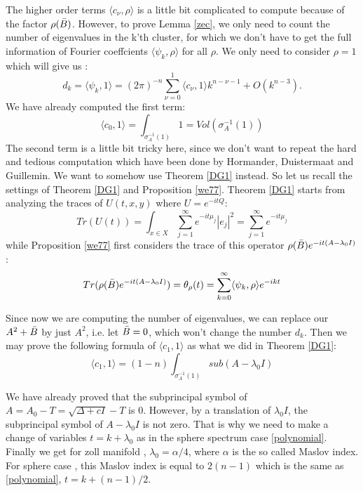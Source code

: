 \documentclass[10pt]{amsart}
\newcommand{\1}{\mathbb{1}}
\begin{document}
The higher order terms $\langle c_{\nu}, \rho \rangle$ is a little bit complicated to compute because of the factor $\rho(\Bar{B})$. However, to prove Lemma \ref{zec}, we only need to count the number of eigenvalues in the k'th cluster, for which we don't have to get the full information of Fourier coeffcients $\langle \psi_k, \rho \rangle$ for all $\rho$.  We only need to consider $\rho =1$ which will give us :
\begin{equation}
    d_k = \langle \psi_k ,1  \rangle = (2\pi)^{-n} \sum_{\nu = 0}^{1} \langle c_{\nu}, 1\rangle k^{n-\nu -1} + O(k^{n-3}).
\end{equation}
We have already computed the first term:
\[
\langle c_0,1  \rangle = \int_{\sigma_A^{-1}(1)} 1 = Vol(\sigma_A^{-1}(1))
\]
The second term is a little bit tricky here, since we don't want to repeat the hard and tedious computation which have been done by Hormander, Duistermaat and Guillemin. We want to somehow use Theorem \ref{DG1} instead. So let us recall the settings of Theorem \ref{DG1} and Proposition \ref{we77}. Theorem \ref{DG1} starts from analyzing the traces of $U(t,x,y)$ where $U = e^{-itQ}$:
\begin{equation}
    Tr (U(t)) = \int_{x\in X} \sum_{j=1}^{\infty} e^{-it\mu_j} |e_j|^2 = \sum_{j=1}^{\infty} e^{-it\mu_j}
\end{equation}
while Proposition \ref{we77} first considers the trace of this operator $\rho(\Bar{B})e^{-it(A-\lambda_0I)}$:
\begin{equation}
    Tr(\rho(\Bar{B})e^{-it(A-\lambda_0I)}) = \theta_{\rho}(t) = \sum_{k=0}^{\infty} \langle \psi_k,\rho \rangle e^{-ikt}
\end{equation}

Since now we are computing the number of eigenvalues, we can replace our $ A^2 + \Bar{B}$ by just $A^2$, i.e. let $\Bar{B} = 0$, which won't change the number $d_k$. Then we may prove the following formula of $\langle c_1,1 \rangle$ as what we did in Theorem \ref{DG1}:
\begin{equation}
    \langle c_1,1 \rangle = (1-n) \int _{\sigma_A^{-1}(1)} sub(A-\lambda_0I)
\end{equation}

We have already proved that the subprincipal symbol of $A = A_0 -T = \sqrt{\Delta + cI} - T$ is 0. However, by a translation of $\lambda_0I$, the subprincipal symbol of $A - \lambda_0I$ is not zero. That is why we need to make a change of variables $t = k + \lambda_0$ as in the sphere spectrum case \eqref{polynomial}. Finally we get for zoll manifold , $\lambda_0 = \alpha /4$, where $\alpha$ is the so called Maslov index. For sphere case , this Maslov index is equal to $2(n-1)$ which is the same as \eqref{polynomial}, $t= k + (n-1)/2$. 
\end{document}
